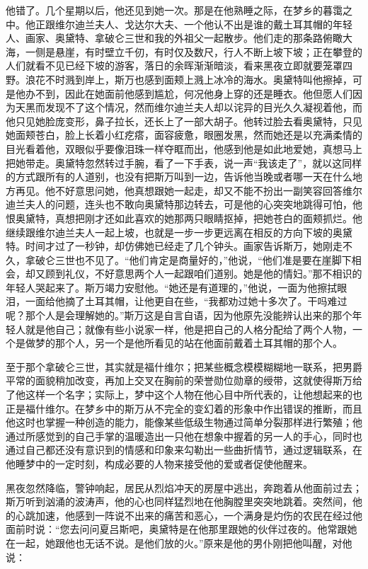 \par 他错了。几个星期以后，他还见到她一次。那是在他熟睡之际，在梦乡的暮霭之中。他正跟维尔迪兰夫人、戈达尔大夫、一个他认不出是谁的戴土耳其帽的年轻人、画家、奥黛特、拿破仑三世和我的外祖父一起散步。他们走的那条路俯瞰大海，一侧是悬崖，有时壁立千仞，有时仅及数尺，行人不断上坡下坡；正在攀登的人们就看不见已经下坡的游客，落日的余晖渐渐暗淡，看来黑夜立即就要笼罩四野。浪花不时溅到岸上，斯万也感到面颊上溅上冰冷的海水。奥黛特叫他擦掉，可是他办不到，因此在她面前他感到尴尬，何况他身上穿的还是睡衣。他但愿人们因为天黑而发现不了这个情况，然而维尔迪兰夫人却以诧异的目光久久凝视着他，而他只见她脸庞变形，鼻子拉长，还长上了一部大胡子。他转过脸去看奥黛特，只见她面颊苍白，脸上长着小红疙瘩，面容疲惫，眼圈发黑，然而她还是以充满柔情的目光看着他，双眼似乎要像泪珠一样夺眶而出，他感到他是如此地爱她，真想马上把她带走。奥黛特忽然转过手腕，看了一下手表，说一声“我该走了”，就以这同样的方式跟所有的人道别，也没有把斯万叫到一边，告诉他当晚或者哪一天在什么地方再见。他不好意思问她，他真想跟她一起走，却又不能不扮出一副笑容回答维尔迪兰夫人的问题，连头也不敢向奥黛特那边转去，可是他的心突突地跳得可怕，他恨奥黛特，真想把刚才还如此喜欢的她那两只眼睛抠掉，把她苍白的面颊抓烂。他继续跟维尔迪兰夫人一起上坡，也就是一步一步更远离在相反的方向下坡的奥黛特。时间才过了一秒钟，却仿佛她已经走了几个钟头。画家告诉斯万，她刚走不久，拿破仑三世也不见了。“他们肯定是商量好的，”他说，“他们准是要在崖脚下相会，却又顾到礼仪，不好意思两个人一起跟咱们道别。她是他的情妇。”那不相识的年轻人哭起来了。斯万竭力安慰他。“她还是有道理的，”他说，一面为他擦拭眼泪，一面给他摘了土耳其帽，让他更自在些，“我都劝过她十多次了。干吗难过呢？那个人是会理解她的。”斯万这是自言自语，因为他原先没能辨认出来的那个年轻人就是他自己；就像有些小说家一样，他是把自己的人格分配给了两个人物，一个是做梦的那个人，另一个是他所看见的站在他面前戴着土耳其帽的那个人。
\par 至于那个拿破仑三世，其实就是福什维尔；把某些概念模模糊糊地一联系，把男爵平常的面貌稍加改变，再加上交叉在胸前的荣誉勋位勋章的绶带，这就使得斯万给了他这样一个名字；实际上，梦中这个人物在他心目中所代表的，让他想起来的也正是福什维尔。在梦乡中的斯万从不完全的变幻着的形象中作出错误的推断，而且他这时也掌握一种创造的能力，能像某些低级生物通过简单分裂那样进行繁殖；他通过所感觉到的自己手掌的温暖造出一只他在想象中握着的另一人的手心，同时也通过自己都还没有意识到的情感和印象来勾勒出一些曲折情节，通过逻辑联系，在他睡梦中的一定时刻，构成必要的人物来接受他的爱或者促使他醒来。
\par 黑夜忽然降临，警钟响起，居民从烈焰冲天的房屋中逃出，奔跑着从他面前过去；斯万听到汹涌的波涛声，他的心也同样猛烈地在他胸膛里突突地跳着。突然间，他的心跳加速，他感到一阵说不出来的痛苦和恶心，一个满身是灼伤的农民在经过他面前时说：“您去问问夏吕斯吧，奥黛特是在他那里跟她的伙伴过夜的。他常跟她在一起，她跟他也无话不说。是他们放的火。”原来是他的男仆刚把他叫醒，对他说：
